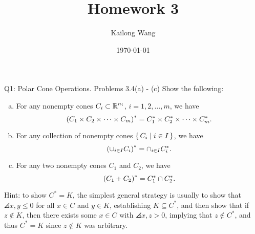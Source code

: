\documentclass{article}
\title{Homework 3}
\author{Kailong Wang}
\date{\today}
\begin{document}
\maketitle

\begin{problem}
    {Q1: Polar Cone Operations. Problems 3.4(a) - (c)}
    Show the following:
    \begin{enumerate}[(a)]
        \item For any nonempty cones $C_i\subset \R^{n_i}$, $i=1,2,\ldots,m$, we have \[\parens*{C_1 \times C_2 \times \cdots \times C_m}^*=C_1^*\times C_2^* \times \cdots \times C_m^*.\]
        \item For any collection of nonempty cones $\set{C_i\mid i\in I}$, we have \[\parens*{\cup_{i\in I}C_i}^*=\cap_{i\in I}C_i^*.\]
        \item For any two nonempty cones $C_1$ and $C_2$, we have \[\parens*{C_1+C_2}^*=C_1^*\cap C_2^*.\]
    \end{enumerate}
    Hint: to show $C^*=K$, the simplest general strategy is usually to show that $\angles{x,y}\leq 0$ for all $x\in C$ and $y\in K$, establishing $K\subseteq C^*$, and then show that if $z\notin K$, then there exists some $x\in C$ with $\angles{x,z}>0$, implying that $z\notin C^*$, and thus $C^*=K$ since $z\notin K$ was arbitrary.
\end{problem}
\end{document}
